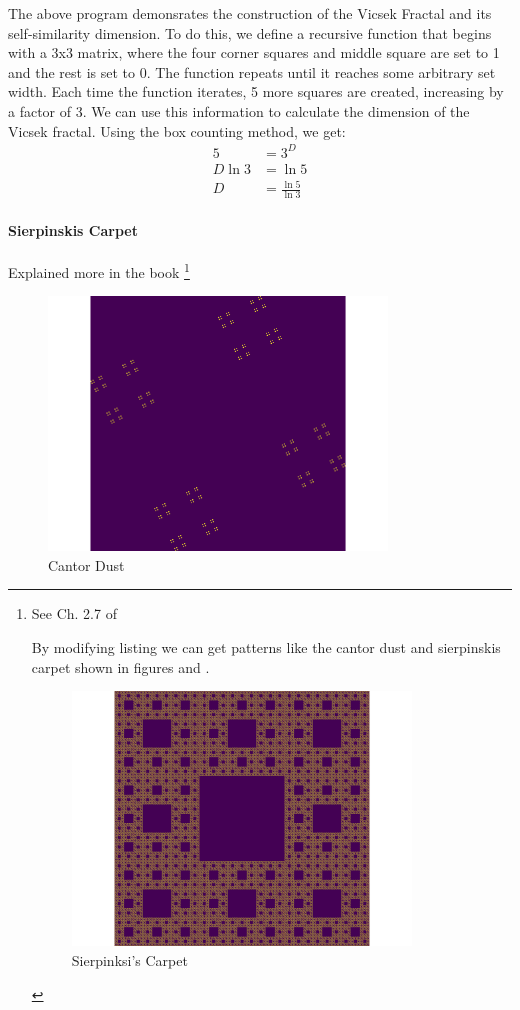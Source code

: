 \documentclass[11pt]{article}
\begin{document}
The above program demonsrates the construction of the Vicsek Fractal and its self-similarity dimension. To do this, we define a recursive function that begins with a 3x3 matrix, where the four corner squares and middle square are set to 1 and the rest is set to 0. The function repeats until it reaches some arbitrary set width. Each time the function iterates, 5 more squares are created, increasing by a factor of 3. We can use this information to calculate the dimension of the Vicsek fractal.
Using the box counting method, we get:
\begin{align*}
5 &= 3^D\\
D\ln{3} &= \ln{5}\\
D &= \frac{\ln{5}}{\ln{3}}
\end{align*}
\paragraph{Sierpinskis Carpet}
\label{sec:orge95918c}

Explained more in the book \footnote{See Ch. 2.7 of \cite[Ch. 2.7]{peitgenChaosFractalsNew2004}

By modifying listing we can get patterns like the cantor dust and sierpinskis carpet shown in figures and .

\begin{figure}[htbp]
\centering
\includegraphics[width=9cm]{./media/sierpinsky_carpet.png}
\caption{\label{square-carpet}Sierpinksi's Carpet}
\end{figure}}

\begin{figure}[htbp]
\centering
\includegraphics[width=9cm]{media/Cantor_Dust_gen.png}
\caption{\label{cantor-dust}Cantor Dust}
\end{figure}
\end{document}
